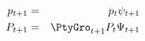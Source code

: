 \begin{eqnarray}
  {{p}}_{t+1} & = & {{p}}_{t} \psi_{t+1}  \label{eq:IndRandWalk}
  \\  {P}_{t+1} & = & \PtyGro_{t+1} {P}_{t}\Psi_{t+1}  \label{eq:AggRandWalk}
 
\end{eqnarray}
